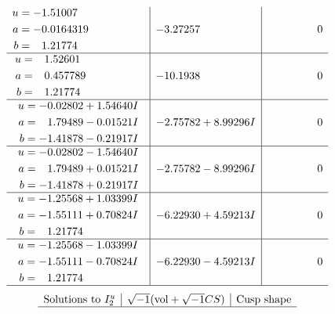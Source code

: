 \documentclass[1p]{elsarticle_modified}
\theoremstyle{definition}
\newcommand{\I}{\sqrt{-1}}
\begin{document}
$$\begin{array}{c|c|c}
\begin{aligned}
u &= -1.51007\phantom{ +0.000000I} \\
a &= -0.0164319\phantom{ +0.000000I} \\
b &= \phantom{-}1.21774\phantom{ +0.000000I}\end{aligned}
 & -3.27257\phantom{ +0.000000I} & \phantom{-0.000000 } 0 \\ \hline\begin{aligned}
u &= \phantom{-}1.52601\phantom{ +0.000000I} \\
a &= \phantom{-}0.457789\phantom{ +0.000000I} \\
b &= \phantom{-}1.21774\phantom{ +0.000000I}\end{aligned}
 & -10.1938\phantom{ +0.000000I} & \phantom{-0.000000 } 0 \\ \hline\begin{aligned}
u &= -0.02802 + 1.54640 I \\
a &= \phantom{-}1.79489 - 0.01521 I \\
b &= -1.41878 - 0.21917 I\end{aligned}
 & -2.75782 + 8.99296 I & \phantom{-0.000000 } 0 \\ \hline\begin{aligned}
u &= -0.02802 - 1.54640 I \\
a &= \phantom{-}1.79489 + 0.01521 I \\
b &= -1.41878 + 0.21917 I\end{aligned}
 & -2.75782 - 8.99296 I & \phantom{-0.000000 } 0 \\ \hline\begin{aligned}
u &= -1.25568 + 1.03399 I \\
a &= -1.55111 + 0.70824 I \\
b &= \phantom{-}1.21774\phantom{ +0.000000I}\end{aligned}
 & -6.22930 + 4.59213 I & \phantom{-0.000000 } 0 \\ \hline\begin{aligned}
u &= -1.25568 - 1.03399 I \\
a &= -1.55111 - 0.70824 I \\
b &= \phantom{-}1.21774\phantom{ +0.000000I}\end{aligned}
 & -6.22930 - 4.59213 I & \phantom{-0.000000 } 0\\
 \hline 
 \end{array}$$\newpage$$\begin{array}{c|c|c}  
\text{Solutions to }I^u_{2}& \I (\text{vol} + \sqrt{-1}CS) & \text{Cusp shape}\\
 \hline 

\end{array}$$
\end{document}
